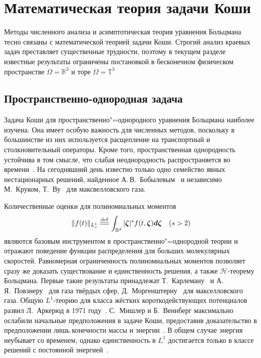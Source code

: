 \section{Математическая теория задачи Коши} \label{sect:cauchy}

Методы численного анализа и асимптотическая теория уравнения Больцмана тесно связаны
с математической теорией задачи Коши.
Строгий анализ краевых задач преставляет существенные трудности, поэтому в текущем разделе
известные результаты ограничены постановкой в бесконечном физическом пространстве \(\Omega=\mathbb{R}^3\)
и торе \(\Omega=\mathbb{T}^3\)

\subsection{Пространственно-однородная задача}

Задача Коши для пространственно"=однородного уравнения Больцмана наиболее изучена.
Она имеет особую важность для численных методов, поскольку в большинстве из них используется
расщепление на транспортный и столкновительный операторы.
Кроме того, пространственная однородность устойчива в том смысле, что
слабая неоднородность распространяется во времени~\cite{Arkeryd1987}.
На сегодняшний день известно только одно семейство явных нестационарных решений,
найденное А.\,В.~Бобылевым~\cite{Bobylev1975} и независимо М.~Круком, Т.~Ву~\cite{Krook1976} для максвелловского газа.

Количественные оценки для полиномиальных моментов
\begin{equation*}
    \|f(t)\|_{L^1_s} \eqdef \int_{\mathbb{R}^d} |\bzeta|^s f(t,\bzeta)\dzeta \quad (s>2)
\end{equation*}
являются базовым инструментом в пространственно"=однородной теории
и отражают поведение функции распределения для больших молекулярных скоростей.
Равномерная ограниченность полиномиальных моментов позволяет сразу же доказать
существование и единственность решения, а также \(\mathcal{H}\)-теорему Больцмана.
Первые такие результаты принадлежат Т.~Карлеману~\cite{Carleman1933} и А.\,Я.~Повзнеру~\cite{Povzner1962}
для газа твёрдых сфер, Д.~Моргенштерну~\cite{Morgenstern1954} для макселловского газа.
Общую \(L^1\)-теорию для класса жёстких короткодействующих потенциалов развил Л.~Аркерюд в 1971 году~\cite{Arkeryd1972}.
С.~Мишлер и Б.~Веннберг максимально ослабили начальные предположения в задаче Коши,
предоставив доказательство в предположении лишь конечности массы и энергии~\cite{Mischler1999}.
В общем случае энергия неубывает со временем, однако единственность в \(L^1\) достигается
только в классе решений с постоянной энергией~\cite{Wennberg1999}.

